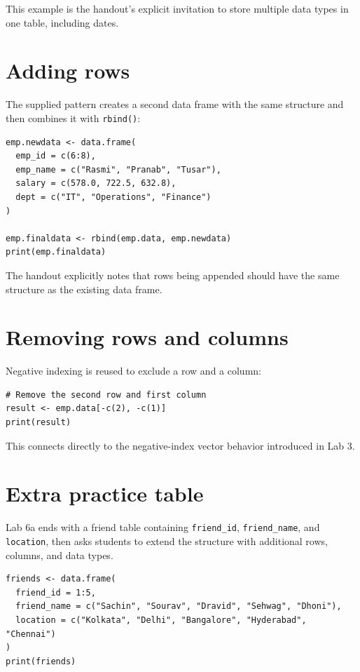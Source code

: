 This example is the handout's explicit invitation to store multiple data types in one table, including dates.

\section{Adding rows}

The supplied pattern creates a second data frame with the same structure and then combines it with \texttt{rbind()}:

\begin{lstlisting}[style=dsr]
emp.newdata <- data.frame(
  emp_id = c(6:8),
  emp_name = c("Rasmi", "Pranab", "Tusar"),
  salary = c(578.0, 722.5, 632.8),
  dept = c("IT", "Operations", "Finance")
)

emp.finaldata <- rbind(emp.data, emp.newdata)
print(emp.finaldata)
\end{lstlisting}

The handout explicitly notes that rows being appended should have the same structure as the existing data frame.

\section{Removing rows and columns}

Negative indexing is reused to exclude a row and a column:

\begin{lstlisting}[style=dsr]
# Remove the second row and first column
result <- emp.data[-c(2), -c(1)]
print(result)
\end{lstlisting}

This connects directly to the negative-index vector behavior introduced in Lab 3.

\section{Extra practice table}

Lab 6a ends with a friend table containing \texttt{friend\_id}, \texttt{friend\_name}, and \texttt{location}, then asks students to extend the structure with additional rows, columns, and data types.

\begin{lstlisting}[style=dsr]
friends <- data.frame(
  friend_id = 1:5,
  friend_name = c("Sachin", "Sourav", "Dravid", "Sehwag", "Dhoni"),
  location = c("Kolkata", "Delhi", "Bangalore", "Hyderabad", "Chennai")
)
print(friends)
\end{lstlisting}

